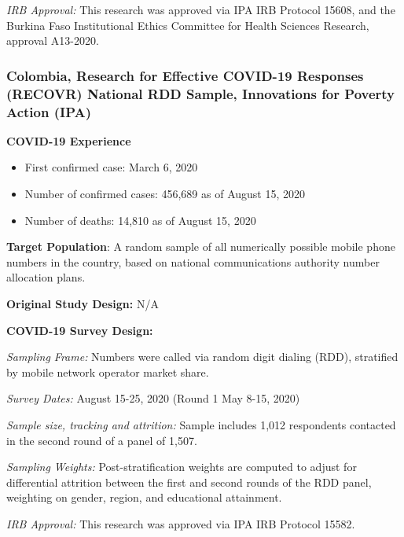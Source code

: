 \documentclass[
  12pt,
]{article}
\begin{document}
\emph{IRB Approval:} This research was approved via IPA IRB Protocol 15608, and the Burkina Faso Institutional Ethics Committee for Health Sciences Research, approval A13-2020.

\hypertarget{colombia-research-for-effective-covid-19-responses-recovr-national-rdd-sample-innovations-for-poverty-action-ipa}{%
\subsubsection*{Colombia, Research for Effective COVID-19 Responses (RECOVR) National RDD Sample, Innovations for Poverty Action (IPA)}\label{colombia-research-for-effective-covid-19-responses-recovr-national-rdd-sample-innovations-for-poverty-action-ipa}}

\textbf{COVID-19 Experience}

\begin{itemize}
\item First confirmed case: March 6, 2020
\item Number of confirmed cases:  456,689 as of August 15, 2020
\item Number of deaths:  14,810 as of August 15, 2020
\end{itemize}

\textbf{Target Population}: A random sample of all numerically possible mobile phone numbers in the country, based on national communications authority number allocation plans.

\textbf{Original Study Design:} N/A

\textbf{COVID-19 Survey Design:}

\emph{Sampling Frame:} Numbers were called via random digit dialing (RDD), stratified by mobile network operator market share.

\emph{Survey Dates:} August 15-25, 2020 (Round 1 May 8-15, 2020)

\emph{Sample size, tracking and attrition:} Sample includes 1,012 respondents contacted in the second round of a panel of 1,507.

\emph{Sampling Weights:} Post-stratification weights are computed to adjust for differential attrition between the first and second rounds of the RDD panel, weighting on gender, region, and educational attainment.

\emph{IRB Approval:} This research was approved via IPA IRB Protocol 15582.
\end{document}

